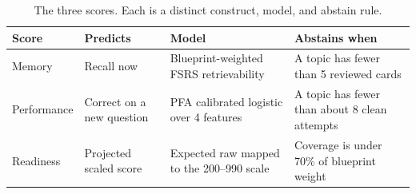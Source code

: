 \documentclass[11pt]{article}
\begin{document}
\begin{table}[t]
\centering
\small
\begin{tabular}{@{}p{2.0cm}p{3.3cm}p{3.6cm}p{4.2cm}@{}}
\toprule
\textbf{Score} & \textbf{Predicts} & \textbf{Model} & \textbf{Abstains when} \\
\midrule
Memory & Recall now & Blueprint-weighted FSRS retrievability & A topic has fewer than 5 reviewed cards \\
Performance & Correct on a new question & PFA calibrated logistic over 4 features & A topic has fewer than about 8 clean attempts \\
Readiness & Projected scaled score & Expected raw mapped to the 200--990 scale & Coverage is under 70\% of blueprint weight \\
\bottomrule
\end{tabular}
\caption{The three scores. Each is a distinct construct, model, and abstain rule.}
\label{tab:scores}
\end{table}
\end{document}
